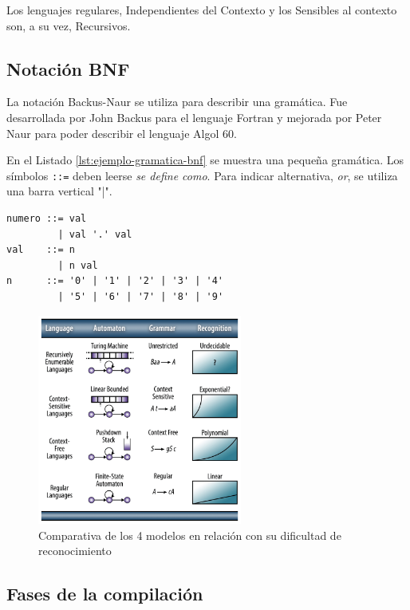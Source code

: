 Los lenguajes regulares, Independientes del Contexto y los Sensibles al contexto son, a su vez, Recursivos.

\subsection{Notación BNF}

La notación Backus-Naur se utiliza para describir una gramática. Fue desarrollada por John Backus para el lenguaje Fortran y mejorada por Peter Naur para poder describir el lenguaje Algol 60.

En el Listado \ref{lst:ejemplo-gramatica-bnf} se muestra una pequeña gramática. Los símbolos \verb|::=| deben leerse \emph{se define como}. Para indicar alternativa, \emph{or}, se utiliza una barra vertical "|".

\begin{lstlisting}[caption={Gramática en notación BNF},label=lst:ejemplo-gramatica-bnf]
numero ::= val
         | val '.' val
val    ::= n
         | n val
n      ::= '0' | '1' | '2' | '3' | '4'
         | '5' | '6' | '7' | '8' | '9'
\end{lstlisting}

\begin{figure}[hp!]
    \centering
    \includegraphics[width=0.6\textwidth]{imaxes/c-bases-teoricas/hauser-2016.png}
    \caption{Comparativa de los 4 modelos en relación con su dificultad de reconocimiento \cite{teoriaCompiladores_hauser_automatas}}
    \label{fig:hauser-2016}
\end{figure}

\subsection{Fases de la compilación}

